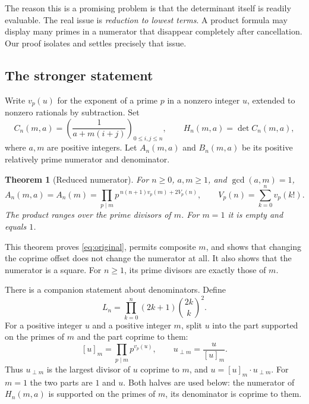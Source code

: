 \documentclass[11pt,a4paper]{article}
\numberwithin{equation}{section}
\newtheorem{theorem}{Theorem}[section]
\theoremstyle{definition}
\theoremstyle{remark}
\begin{document}
The reason this is a promising problem is that the determinant itself is readily evaluable. The real issue is \emph{reduction to lowest terms}. A product formula may display many primes in a numerator that disappear completely after cancellation. Our proof isolates and settles precisely that issue.

\subsection{The stronger statement}
Write $v_p(u)$ for the exponent of a prime $p$ in a nonzero integer $u$, extended to nonzero rationals by subtraction. Set
\begin{equation}\label{eq:defH}
 C_n(m,a)=\left(\frac1{a+m(i+j)}\right)_{0\leq i,j\leq n},
 \qquad H_n(m,a)=\det C_n(m,a),
\end{equation}
where $a,m$ are positive integers. Let $A_n(m,a)$ and $B_n(m,a)$ be its positive relatively prime numerator and denominator.

\begin{theorem}[Reduced numerator]\label{thm:numerator}
For $n\geq0$, $a,m\geq1$, and $\gcd(a,m)=1$,
\begin{equation}\label{eq:main}
 \boxed{\displaystyle
 A_n(m,a)=A_n(m)=
 \prod_{p\mid m}p^{\,n(n+1)v_p(m)+2V_p(n)},
 \qquad V_p(n)=\sum_{k=0}^n v_p(k!).}
\end{equation}
The product ranges over the prime divisors of $m$. For $m=1$ it is empty and equals $1$.
\end{theorem}

This theorem proves \eqref{eq:original}, permits composite $m$, and shows that changing the coprime offset does not change the numerator at all. It also shows that the numerator is a square. For $n\geq1$, its prime divisors are exactly those of $m$.

There is a companion statement about denominators. Define
\begin{equation}\label{eq:Ldef}
 L_n=\prod_{k=0}^n(2k+1)\binom{2k}{k}^{\!2}.
\end{equation}
For a positive integer $u$ and a positive integer $m$, split $u$ into the part supported on the primes of $m$ and the part coprime to them:
\begin{equation}\label{eq:parts}
 [u]_m=\prod_{p\mid m}p^{v_p(u)},\qquad
 u_{\perp m}=\frac u{[u]_m}.
\end{equation}
Thus $u_{\perp m}$ is the largest divisor of $u$ coprime to $m$, and $u=[u]_m\cdot u_{\perp m}$. For $m=1$ the two parts are $1$ and $u$. Both halves are used below: the numerator of $H_n(m,a)$ is supported on the primes of $m$, its denominator is coprime to them.
\end{document}
